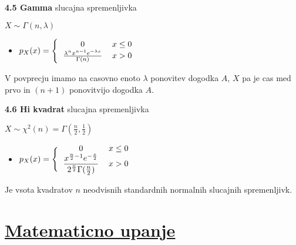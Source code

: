 \documentclass{article}
\begin{document}
\begin{multicols}{2}
\textbf{4.5 Gamma} slucajna spremenljivka
\begin{center}
    \begin{math}
        X \sim \Gamma(n, \lambda)
    \end{math}
\end{center}

\begin{itemize}
    \item  \begin{math}
        p_{X}(x) =
        \Bigg\{\begin{tabular}{ccc}
          $0$  & $x \leq 0$ & \\
          $\frac{\lambda^{n} x^{n- 1} e^{ - \lambda x}}{\Gamma(n)}$ & $x > 0$ & \\
        \end{tabular}
    \end{math} 
\end{itemize}

V povprecju imamo na casovno enoto $\lambda$ ponovitev dogodka $A$, $X$ pa je cas med
prvo in $(n + 1)$ ponovitvijo dogodka $A$.

\textbf{4.6 Hi kvadrat} slucajna spremenljivka
\begin{center}
    \begin{math}
        X \sim \chi^{2}(n) = \Gamma(\frac{n}{2}, \frac{1}{2})
    \end{math}
\end{center}

\begin{itemize}
    \item  \begin{math}
        p_{X}(x) =
        \Bigg\{\begin{tabular}{ccc}
          $0$  & $x \leq 0$ & \\
          $\dfrac{x^{\frac{n}{2} - 1} e ^{- \frac{x}{2}}}{2^{\frac{n}{2}} \Gamma(\frac{n}{2})}$ & $x > 0$ & \\
        \end{tabular}
    \end{math} 
\end{itemize}

Je vsota kvadratov $n$ neodvisnih standardnih normalnih slucajnih spremenljivk.

\section{\underline{Matematicno upanje}}


\end{multicols}
\end{document}
